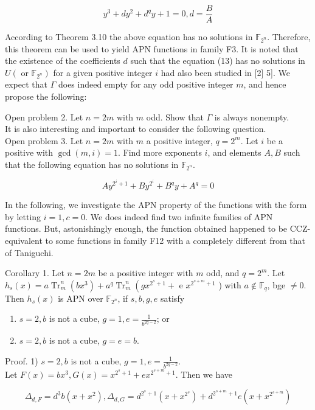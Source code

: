 \documentclass[10pt]{article}
\begin{document}
$$
y^{3}+d y^{2}+d^{q} y+1=0, d=\frac{B}{A}
$$

According to Theorem 3.10 the above equation has no solutions in $\mathbb{F}_{2^{n}}$. Therefore, this theorem can be used to yield APN functions in family F3. It is noted that the existence of the coefficients $d$ such that the equation (13) has no solutions in $U\left(\right.$ or $\left.\mathbb{F}_{2^{n}}\right)$ for a given positive integer $i$ had also been studied in [2] 5]. We expect that $\Gamma$ does indeed empty for any odd positive integer $m$, and hence propose the following:

Open problem 2. Let $n=2 m$ with $m$ odd. Show that $\Gamma$ is always nonempty.\\
It is also interesting and important to consider the following question.\\
Open problem 3. Let $n=2 m$ with $m$ a positive integer, $q=2^{m}$. Let $i$ be a positive with $\operatorname{gcd}(m, i)=1$. Find more exponents $i$, and elements $A, B$ such that the following equation has no solutions in $\mathbb{F}_{2^{n}}$.

$$
A y^{2^{i}+1}+B y^{2^{i}}+B^{q} y+A^{q}=0
$$

In the following, we investigate the APN property of the functions with the form by letting $i=1, c=0$. We does indeed find two infinite families of APN functions. But, astonishingly enough, the function obtained happened to be CCZ-equivalent to some functions in family F12 with a completely different from that of Taniguchi.

Corollary 1. Let $n=2 m$ be a positive integer with $m$ odd, and $q=2^{m}$. Let $h_{s}(x)=a \operatorname{Tr}_{m}^{n}\left(b x^{3}\right)+a^{q} \operatorname{Tr}_{m}^{n}\left(g x^{2^{s}+1}+\right.$ e $x^{2^{s+m}+1}$ ) with $a \notin \mathbb{F}_{q}$, bge $\neq 0$. Then $h_{s}(x)$ is APN over $\mathbb{F}_{2^{n}}$, if $s, b, g, e$ satisfy

\begin{enumerate}
  \item $s=2, b$ is not a cube, $g=1, e=\frac{1}{b^{2 q-2}}$; or
  \item $s=2, b$ is not a cube, $g=e=b$.
\end{enumerate}

Proof. 1) $s=2, b$ is not a cube, $g=1, e=\frac{1}{b^{2 q-2}}$.\\
Let $F(x)=b x^{3}, G(x)=x^{2^{s}+1}+e x^{2^{s+m}+1}$. Then we have

$$
\Delta_{d, F}=d^{3} b\left(x+x^{2}\right), \Delta_{d, G}=d^{2^{s}+1}\left(x+x^{2^{s}}\right)+d^{2^{s+m}+1} e\left(x+x^{2^{s+m}}\right)
$$
\end{document}
